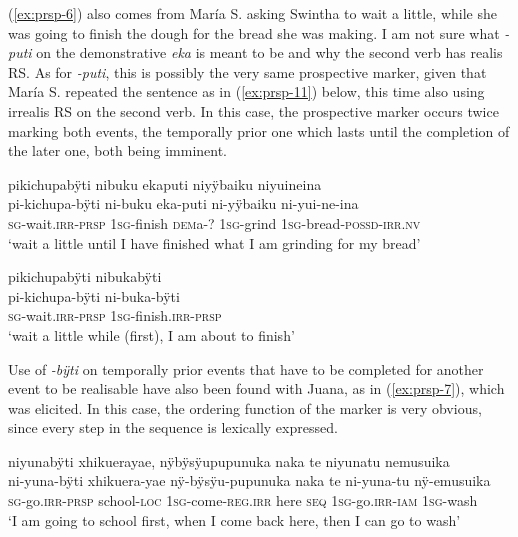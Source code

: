 (\ref{ex:prsp-6}) also comes from María S. asking Swintha to wait a little, while she was going to finish the dough for the bread she was making. I am not sure what \mbox{\textit{-puti}} on the demonstrative \textit{eka} is meant to be and why the second verb has realis RS. As for \textit{-puti}, this is possibly the very same prospective marker, given that María S. repeated the sentence as in (\ref{ex:prsp-11}) below, this time also using irrealis RS on the second verb. In this case, the prospective marker occurs twice marking both events, the temporally prior one which lasts until the completion of the later one, both being imminent.

\ea\label{ex:prsp-6}
\begingl
\glpreamble pikichupabÿti nibuku ekaputi niyÿbaiku niyuineina\\
\gla pi-kichupa-bÿti ni-buku eka-puti ni-yÿbaiku ni-yui-ne-ina\\
\textsc{sg}-wait.\textsc{irr}-\textsc{prsp} 1\textsc{sg}-finish \textsc{dem}a-? 1\textsc{sg}-grind 1\textsc{sg}-bread-\textsc{possd}-\textsc{irr.nv}\\
\glft ‘wait a little until I have finished what I am grinding for my bread’
\endgl
\trailingcitation{[rxx-e150220s-1.10]}
\xe

\ea\label{ex:prsp-11}
\begingl
\glpreamble pikichupabÿti nibukabÿti\\
\gla pi-kichupa-bÿti ni-buka-bÿti\\
\textsc{sg}-wait.\textsc{irr}-\textsc{prsp} 1\textsc{sg}-finish.\textsc{irr}-\textsc{prsp} \\
\glft ‘wait a little while (first), I am about to finish’
\endgl
\trailingcitation{[rxx-e150220s-1.11]}
\xe

Use of \textit{-bÿti} on temporally prior events that have to be completed for another event to be realisable have also been found with Juana, as in (\ref{ex:prsp-7}), which was elicited. In this case, the ordering function of the marker is very obvious, since every step in the sequence is lexically expressed. 

\ea\label{ex:prsp-7}
\begingl
\glpreamble niyunabÿti xhikuerayae, nÿbÿsÿupupunuka naka te niyunatu nemusuika\\
\gla ni-yuna-bÿti xhikuera-yae nÿ-bÿsÿu-pupunuka naka te ni-yuna-tu nÿ-emusuika\\
\textsc{sg}-go.\textsc{irr}-\textsc{prsp} school-\textsc{loc} 1\textsc{sg}-come-\textsc{reg.irr} here \textsc{seq} 1\textsc{sg}-go.\textsc{irr}-\textsc{iam} 1\textsc{sg}-wash\\
\glft ‘I am going to school first, when I come back here, then I can go to wash’
\endgl
\trailingcitation{[jxx-e190210s-01]}
\xe

